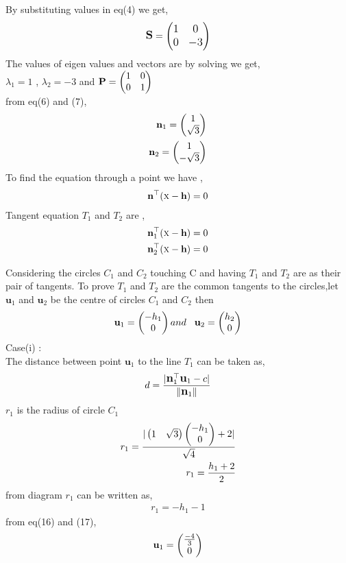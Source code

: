 By substituting values in eq(4) we get,
\begin{align}
\large \textbf{S}= \begin{pmatrix} 1 &0 \\0 &-3\end{pmatrix}
\end{align}
The values of eigen values and vectors are by solving we get,\\
$\lambda_1 = 1 $ , $\lambda_2 = -3 $ and \large $\textbf{P}=\begin{pmatrix}1&0\\0&1\end{pmatrix}$ \\

\Large from eq(6) and (7), \\
\begin{align}
\textbf{n}_{1}=\begin{pmatrix}1 \\ \sqrt{3}\end{pmatrix} \\
\textbf{n}_{2}=\begin{pmatrix}1 \\ -\sqrt{3}\end{pmatrix}
\end{align}
To find the equation through a point we have ,
\begin{align}
\textbf{n}^\top(\textsc{x}-\textbf{h})=0
\end{align}
Tangent equation $ T_1 $ and $T_2$ are ,
\begin{align}
\textbf{n}_{1}^\top(\textsc{x}-\textbf{h})=0 \\
\textbf{n}_{2}^\top(\textsc{x}-\textbf{h})=0
\end{align}  

Considering the circles $ C_1 $ and $C_2$ touching C and having $ T_1 $ and $T_2$ are as their pair of tangents. To prove $ T_1 $ and $T_2$  are the common tangents to the circles,let  $\textbf{u}_{1}$ and $\textbf{u}_{2}$ be the centre of circles $ C_1 $ and $C_2$ then \\
\begin{align}
\textbf{u}_{1}=\begin{pmatrix}-h_1 \\ 0\end{pmatrix} and \hspace{0.3cm} \textbf{u}_{2}=\begin{pmatrix}h_2 \\ 0\end{pmatrix} 
\end{align}
Case(i) : \\
The distance between point $\textbf{u}_{1}$  to the line $ T_1 $ can be taken as, 
\begin{align}
\large d=\frac{|\textbf{n}_{1}^\top\textbf{u}_{1}-c|}{\|\textbf{n}_{1}\|} 
\end{align}
$r_1$ is the radius of circle $C_1$
\begin{align}
r_1=\frac{|\begin{pmatrix} 1 & \sqrt{3} \end{pmatrix}\begin{pmatrix}-h_1 \\ 0\end{pmatrix}+2|}{\sqrt{4}} \\
r_1=\frac{h_1+2}{2}
\end{align}
from diagram $r_1$ can be written as,
\begin{align}
r_1=-h_1-1
\end{align}
from eq(16) and (17),
\begin{align}
\textbf{u}_{1}=\begin{pmatrix}\frac{-4}{3} \\ 0\end{pmatrix}
\end{align}

